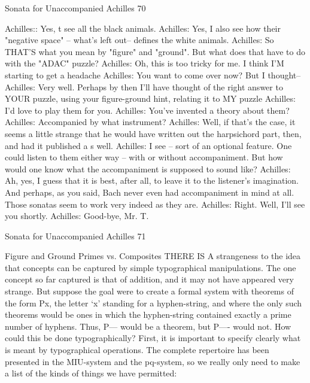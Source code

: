 Sonata for Unaccompanied Achilles                                                         70

Achilles:: Yes, t see all the black animals.
Achilles: Yes, I also see how their "negative space" -- what's left out-- defines the white
       animals.
Achilles: So THAT'S what you mean by "figure" and "ground". But what does that have
       to do with the "ADAC" puzzle?
Achilles: Oh, this is too tricky for me. I think I'M starting to get a headache
Achilles: You want to come over now? But I thought--
Achilles: Very well. Perhaps by then I'll have thought of the right answer to YOUR
       puzzle, using your figure-ground hint, relating it to MY puzzle
Achilles: I'd love to play them for you.
Achilles: You've invented a theory about them?
Achilles: Accompanied by what instrument?
Achilles: Well, if that's the case, it seems a little strange that he would have written out
       the harpsichord part, then, and had it published a s well.
Achilles: I see -- sort of an optional feature. One could listen to them either way -- with
       or without accompaniment. But how would one know what the accompaniment is
       supposed to sound like?
Achilles: Ah, yes, I guess that it is best, after all, to leave it to the listener’s imagination.
       And perhaps, as you said, Bach never even had accompaniment in mind at all.
       Those sonatas seem to work very indeed as they are.
Achilles: Right. Well, I'll see you shortly.
Achilles: Good-bye, Mr. T.




Sonata for Unaccompanied Achilles                                                             71


                          Figure and Ground
                                Primes vs. Composites
THERE IS A strangeness to the idea that concepts can be captured by simple
typographical manipulations. The one concept so far captured is that of addition, and it
may not have appeared very strange. But suppose the goal were to create a formal system
with theorems of the form Px, the letter `x' standing for a hyphen-string, and where the
only such theorems would be ones in which the hyphen-string contained exactly a prime
number of hyphens. Thus, P--- would be a theorem, but P---- would not. How could this
be done typographically? First, it is important to specify clearly what is meant by
typographical operations. The complete repertoire has been presented in the MIU-system
and the pq-system, so we really only need to make a list of the kinds of things we have
permitted:

